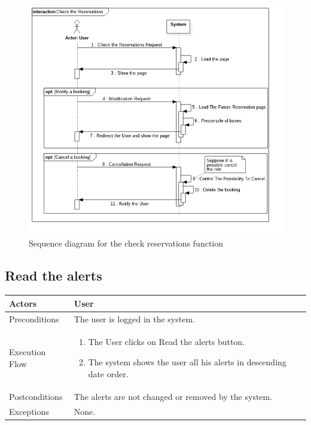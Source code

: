 \begin{figure}
	\centerline{\includegraphics[width=\paperwidth]{./figures/SD_CheckReservations.png}}
	\caption{Sequence diagram for the check reservations function}
\end{figure}

\clearpage

\subsection{Read the alerts}
\begin{tabular}{lp{8cm}}
	\hline 
	Actors & User \\ \hline
	Preconditions & The user is logged in the system.  \\ \hline
	Execution Flow &  \begin{enumerate}
						\item The User clicks on Read the alerts button.
						\item The system shows the user all his alerts in descending date order.
					\end{enumerate}
	 \\ \hline
	 Postconditions & The alerts are not changed or removed by the system. \\ \hline
	 Exceptions & None.  \\ \hline
\end{tabular}\\
\\

